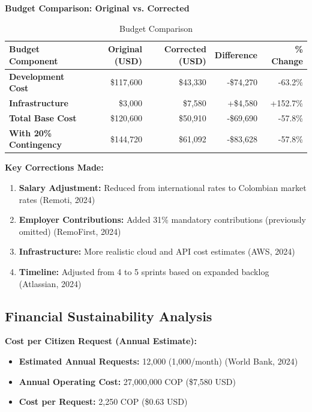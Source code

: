 \documentclass[12pt,a4paper]{article}
\begin{document}
\textbf{Budget Comparison: Original vs. Corrected}

\begin{table}[h]
\centering
\caption{Budget Comparison}
\label{tab:comparison}
\begin{tabular}{|l|r|r|r|r|}
\hline
\textbf{Budget Component} & \textbf{Original (USD)} & \textbf{Corrected (USD)} & \textbf{Difference} & \textbf{\% Change} \\
\hline
\textbf{Development Cost} & \$117,600 & \$43,330 & -\$74,270 & -63.2\% \\
\textbf{Infrastructure} & \$3,000 & \$7,580 & +\$4,580 & +152.7\% \\
\textbf{Total Base Cost} & \$120,600 & \$50,910 & -\$69,690 & -57.8\% \\
\textbf{With 20\% Contingency} & \$144,720 & \$61,092 & -\$83,628 & -57.8\% \\
\hline
\end{tabular}
\end{table}

\textbf{Key Corrections Made:}
\begin{enumerate}
    \item \textbf{Salary Adjustment:} Reduced from international rates to Colombian market rates (Remoti, 2024)
    \item \textbf{Employer Contributions:} Added 31\% mandatory contributions (previously omitted) (RemoFirst, 2024)
    \item \textbf{Infrastructure:} More realistic cloud and API cost estimates (AWS, 2024)
    \item \textbf{Timeline:} Adjusted from 4 to 5 sprints based on expanded backlog (Atlassian, 2024)
\end{enumerate}

\subsection{Financial Sustainability Analysis}

\textbf{Cost per Citizen Request (Annual Estimate):}
\begin{itemize}
    \item \textbf{Estimated Annual Requests:} 12,000 (1,000/month) (World Bank, 2024)
    \item \textbf{Annual Operating Cost:} 27,000,000 COP (\$7,580 USD)
    \item \textbf{Cost per Request:} 2,250 COP (\$0.63 USD)
\end{itemize}
\end{document}
